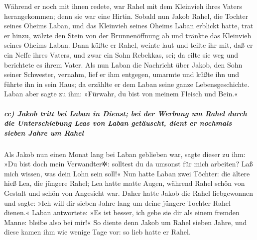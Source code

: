  Während er noch mit ihnen redete, war Rahel mit dem
Kleinvieh ihres Vaters herangekommen; denn sie war eine Hirtin.
 Sobald nun Jakob Rahel, die Tochter seines Oheims Laban,
und das Kleinvieh seines Oheims Laban erblickt hatte, trat er hinzu,
wälzte den Stein von der Brunnenöffnung ab und tränkte das Kleinvieh
seines Oheims Laban.  Dann küßte er Rahel, weinte laut
 und teilte ihr mit, daß er ein Neffe ihres Vaters, und
zwar ein Sohn Rebekkas, sei; da eilte sie weg und berichtete es ihrem
Vater.  Als nun Laban die Nachricht über Jakob, den Sohn
seiner Schwester, vernahm, lief er ihm entgegen, umarmte und küßte ihn
und führte ihn in sein Haus; da erzählte er dem Laban seine ganze
Lebensgeschichte.  Laban aber sagte zu ihm: »Fürwahr, du
bist von meinem Fleisch und Bein.«

\hypertarget{cc-jakob-tritt-bei-laban-in-dienst-bei-der-werbung-um-rahel-durch-die-unterschiebung-leas-von-laban-getuxe4uscht-dient-er-nochmals-sieben-jahre-um-rahel}{%
\subparagraph{cc) Jakob tritt bei Laban in Dienst; bei der Werbung um
Rahel durch die Unterschiebung Leas von Laban getäuscht, dient er
nochmals sieben Jahre um
Rahel}\label{cc-jakob-tritt-bei-laban-in-dienst-bei-der-werbung-um-rahel-durch-die-unterschiebung-leas-von-laban-getuxe4uscht-dient-er-nochmals-sieben-jahre-um-rahel}}

Als Jakob nun einen Monat lang bei Laban geblieben war, 
sagte dieser zu ihm: »Du bist doch mein Verwandter✲: solltest du da
umsonst für mich arbeiten? Laß mich wissen, was dein Lohn sein soll!«
 Nun hatte Laban zwei Töchter: die ältere hieß Lea, die
jüngere Rahel;  Lea hatte matte Augen, während Rahel
schön von Gestalt und schön von Angesicht war.  Daher
hatte Jakob die Rahel liebgewonnen und sagte: »Ich will dir sieben Jahre
lang um deine jüngere Tochter Rahel dienen.«  Laban
antwortete: »Es ist besser, ich gebe sie dir als einem fremden Manne:
bleibe also bei mir!«  So diente denn Jakob um Rahel
sieben Jahre, und diese kamen ihm wie wenige Tage vor: so lieb hatte er
Rahel.

